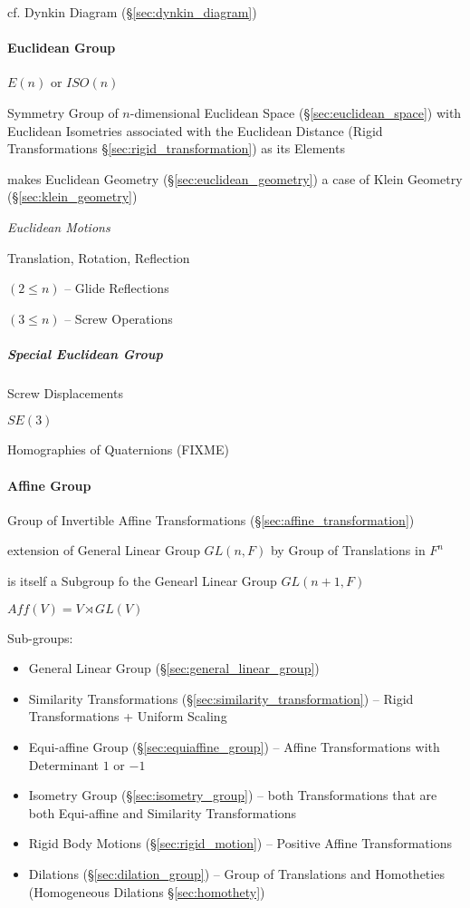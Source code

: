 cf. Dynkin Diagram (\S\ref{sec:dynkin_diagram})



\paragraph{Euclidean Group}\label{sec:euclidean_group}\hfill

$E(n)$ or $ISO(n)$

Symmetry Group of $n$-dimensional Euclidean Space (\S\ref{sec:euclidean_space})
with Euclidean Isometries associated with the Euclidean Distance (Rigid
Transformations \S\ref{sec:rigid_transformation}) as its Elements

makes Euclidean Geometry (\S\ref{sec:euclidean_geometry}) a case of
Klein Geometry (\S\ref{sec:klein_geometry})


\emph{Euclidean Motions}

Translation, Rotation, Reflection

$(2 \leq n)$ -- Glide Reflections

$(3 \leq n)$ -- Screw Operations



\subparagraph{Special Euclidean Group}\label{sec:special_euclidean}\hfill

Screw Displacements

$SE(3)$

Homographies of Quaternions (FIXME)



\paragraph{Affine Group}\label{sec:affine_group}\hfill

Group of Invertible Affine Transformations (\S\ref{sec:affine_transformation})

extension of General Linear Group $GL(n, F)$ by Group of Translations in $F^n$

is itself a Subgroup fo the Genearl Linear Group $GL(n+1, F)$

$Aff(V) = V \rtimes GL(V)$

Sub-groups:
\begin{itemize}
  \item General Linear Group (\S\ref{sec:general_linear_group})
  \item Similarity Transformations (\S\ref{sec:similarity_transformation}) --
    Rigid Transformations + Uniform Scaling
  \item Equi-affine Group (\S\ref{sec:equiaffine_group}) -- Affine
    Transformations with Determinant $1$ or $-1$
  \item Isometry Group (\S\ref{sec:isometry_group}) -- both Transformations that
    are both Equi-affine and Similarity Transformations
  \item Rigid Body Motions (\S\ref{sec:rigid_motion}) -- Positive Affine
    Transformations
  \item Dilations (\S\ref{sec:dilation_group}) -- Group of Translations and
    Homotheties (Homogeneous Dilations \S\ref{sec:homothety})
\end{itemize}



